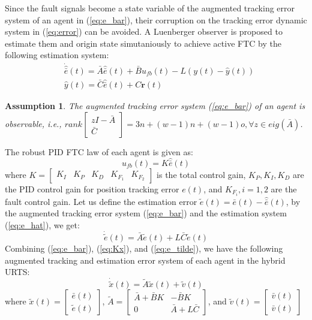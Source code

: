 \documentclass{ieeeaccess}
\newtheorem{assumption}{Assumption}[section]
\begin{document}
Since the fault signals become a state variable of the augmented tracking error system of an agent in (\ref{eq:e_bar}), their corruption on the tracking error dynamic system in (\ref{eq:error}) can be avoided. A Luenberger observer is proposed to estimate them and origin state simutaniously to achieve active FTC by the following estimation system:
\begin{equation} \label{eq:e_hat}
    \begin{split}
        & \dot{\hat{\bar{e}}}(t)=\bar{A}\hat{\bar{e}}(t)+\bar{B}u_{fb}(t)-{L}(y(t)-\hat{y}(t)) \\
        & \hat{y}(t)=\bar{C}\hat{\bar{e}}(t) + C\pmb{r}(t)
    \end{split}
\end{equation}
\begin{assumption}
    The augmented tracking error system (\ref{eq:e_bar}) of an agent is observable, i.e., $rank\begin{bmatrix}
        zI-\bar{A} \\ \bar{C}
    \end{bmatrix} = 3n + (w-1)n + (w-1)o, \forall z \in eig(\bar{A})$.
\end{assumption}
The robust PID FTC law of each agent is given as:
\begin{equation} \label{eq:Kx}
    u_{fb}(t)=K\hat{\bar{e}}(t)
\end{equation}
where $K = \begin{bmatrix}
    K_I & K_P & K_D & K_{F_1} & K_{F_2}
\end{bmatrix}$ is the total control gain, $K_P,K_I,K_D$ are the PID control gain for position tracking error $e(t)$, and $K_{F_i}, i=1,2$ are the fault control gain. Let us define the estimation error $\tilde{e}(t)=\bar{e}(t)-\hat{\bar{e}}(t)$, by the augmented tracking error system (\ref{eq:e_bar}) and the estimation system (\ref{eq:e_hat}), we get:
\begin{equation} \label{eq:e_tilde}
    \dot{\tilde{e}}(t) = \bar{A}\tilde{e}(t) +L\bar{C}\tilde{e}(t)
\end{equation}
Combining (\ref{eq:e_bar}), (\ref{eq:Kx}), and (\ref{eq:e_tilde}), we have the following augmented tracking and estimation error system of each agent in the hybrid URTS:
\begin{equation} \label{eq:aug}
    \dot{\tilde{x}}(t) = \tilde{A}\tilde{x}(t)+\tilde{v}(t)
\end{equation}
where $\tilde{x}(t)=\begin{bmatrix}
    \bar{e}(t) \\ \tilde{e}(t)
\end{bmatrix}$, $\tilde{A}=\begin{bmatrix}
    \bar{A}+\bar{B}K & -\bar{B}K \\ 0 & \bar{A}+L\bar{C}
\end{bmatrix}$, and $\tilde{v}(t)=\begin{bmatrix}
    \bar{v}(t) \\ \bar{v}(t)
\end{bmatrix}$
\end{document}
